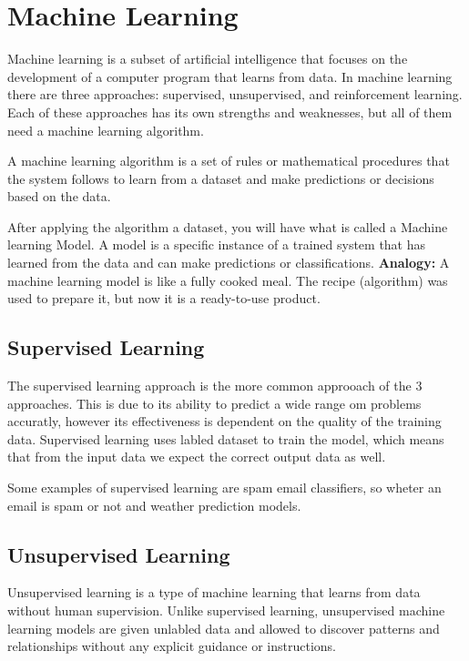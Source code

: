 \section{Machine Learning}
\label{sec:Machine Learning}

Machine learning is a subset of artificial intelligence 
that focuses on the development of a computer program that learns from data.
In machine learning there are three approaches: supervised, unsupervised, and reinforcement learning.
Each of these approaches has its own strengths and weaknesses, but all of them need a machine learning algorithm.

A machine learning algorithm is a set of rules or mathematical 
procedures that the system follows to learn from a dataset 
and make predictions or decisions based on the data.

After applying the algorithm a dataset, you will have what is called a Machine learning Model.
A model is a specific instance of a trained system that has learned from the data and can make predictions or classifications.
\cite{ML-Models}
\textbf{Analogy:} A machine learning model is like a fully cooked meal. 
The recipe (algorithm) was used to prepare it, but now it is a ready-to-use product.



\subsection{Supervised Learning}
The supervised learning approach is the more common approoach of the 3 approaches.
This is due to its ability to predict a wide range om problems accuratly, 
however its effectiveness is dependent on the quality of the training data.
Supervised learning uses labled dataset to train the model, 
which means that from the input data we expect the correct output data as well.
\cite{GoogleCloud-SL}

Some examples of supervised learning are spam email classifiers, 
so wheter an email is spam or not and weather prediction models.

\subsection{Unsupervised Learning}
Unsupervised learning is a type of machine learning 
that learns from data without human supervision. Unlike supervised learning,
unsupervised machine learning models are given unlabled data and allowed to discover patterns 
and relationships without any explicit guidance or instructions. \cite{GoogleCloud-UL}


